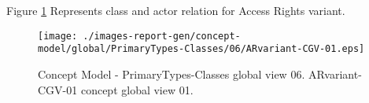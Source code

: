 Figure \ref{fig:lu.uni.lassy.excalibur.MyCrash.G02-CM-view-global-PrimaryTypes-Classes-06} Represents class and actor relation for Access Rights variant.



\begin{figure}[htbp] 
\label{fig:lu.uni.lassy.excalibur.MyCrash.G02-CM}
\begin{center}
\texttt{[image: ./images-report-gen/concept-model/global/PrimaryTypes-Classes/06/ARvariant-CGV-01.eps]}
\end{center}
\caption[Concept Model - PrimaryTypes-Classes global view 06 - ARvariant-CGV-01 concept global view]{Concept Model - PrimaryTypes-Classes global view 06. ARvariant-CGV-01 concept global view 01.}
\label{fig:lu.uni.lassy.excalibur.MyCrash.G02-CM-view-global-PrimaryTypes-Classes-06}
\end{figure}
\vspace{0.5cm} 
